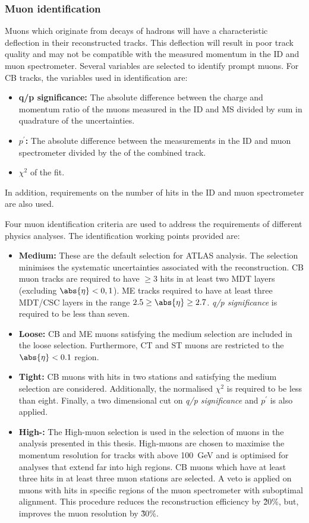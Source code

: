 \subsubsection{Muon identification}
Muons which originate from decays of hadrons will have a characteristic deflection in their reconstructed tracks. This deflection will result in poor track quality and may not be compatible with the measured momentum in the ID and muon spectrometer. Several variables are selected to identify prompt muons. For CB tracks, the variables used in identification are:
\begin{itemize}
    \item \textbf{q/p significance:} The absolute difference between the charge and momentum ratio of the muons measured in the ID and MS divided by sum in quadrature of the uncertainties. 
    \item \textbf{$p^\prime$:} The absolute difference between the \pt measurements in the ID and muon spectrometer divided by the \pt of the combined track.
    \item $\chi^2$ of the fit.
\end{itemize}
In addition, requirements on the number of hits in the ID and muon spectrometer are also used. 

Four muon identification criteria are used to address the requirements of different physics analyses. The identification working points provided are: 
\begin{itemize}
    \item \textbf{Medium:} These are the default selection for ATLAS analysis. The selection minimises the systematic uncertainties associated with the reconstruction. CB muon tracks are required to have $\geq 3$ hits in at least two MDT layers (excluding $\abs{\eta} < 0,1$). ME tracks required to have at least three MDT/CSC layers in the range $2.5 \geq \abs{\eta} \geq 2.7$. \emph{q/p significance} is required to be less than seven.
    \item \textbf{Loose:} CB and ME muons satisfying the medium selection are included in the loose selection. Furthermore, CT and ST muons are restricted to the $\abs{\eta} < 0.1$ region.
    \item \textbf{Tight:} CB muons with hits in two stations and satisfying the medium selection are considered. Additionally, the normalised $\chi^2$ is required to be less than eight. Finally, a two dimensional cut on \emph{q/p significance} and \emph{$p^\prime$} is also applied. 
    \item \textbf{High-\pt:} The High-\pt muon selection is used in the selection of muons in the analysis presented in this thesis. High-\pt muons are chosen to maximise the momentum resolution for tracks with \pt above \SI{100}{\giga\electronvolt} and is optimised for analyses that extend far into high \pt regions. CB muons which have at least three hits in at least three muon stations are selected. A veto is applied on muons with hits in specific regions of the muon spectrometer with suboptimal alignment. This procedure reduces the reconstruction efficiency by \~20\%, but, improves the muon \pt resolution by \~30\%.
\end{itemize}

